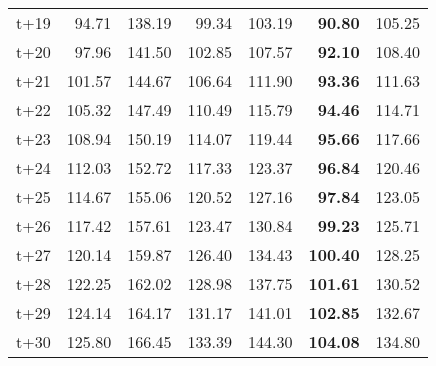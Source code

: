 \begin{table}[H]
\begin{tabular}{lrrrrrr}
t+19  & 94.71  & 138.19  & 99.34  & 103.19  & \textbf{90.80}  & 105.25  \\
t+20  & 97.96  & 141.50  & 102.85  & 107.57  & \textbf{92.10}  & 108.40  \\
t+21  & 101.57  & 144.67  & 106.64  & 111.90  & \textbf{93.36}  & 111.63  \\
t+22  & 105.32  & 147.49  & 110.49  & 115.79  & \textbf{94.46}  & 114.71  \\
t+23  & 108.94  & 150.19  & 114.07  & 119.44  & \textbf{95.66}  & 117.66  \\
t+24  & 112.03  & 152.72  & 117.33  & 123.37  & \textbf{96.84}  & 120.46  \\
t+25  & 114.67  & 155.06  & 120.52  & 127.16  & \textbf{97.84}  & 123.05  \\
t+26  & 117.42  & 157.61  & 123.47  & 130.84  & \textbf{99.23}  & 125.71  \\
t+27  & 120.14  & 159.87  & 126.40  & 134.43  & \textbf{100.40}  & 128.25  \\
t+28  & 122.25  & 162.02  & 128.98  & 137.75  & \textbf{101.61}  & 130.52  \\
t+29  & 124.14  & 164.17  & 131.17  & 141.01  & \textbf{102.85}  & 132.67  \\
t+30  & 125.80  & 166.45  & 133.39  & 144.30  & \textbf{104.08}  & 134.80  \\

\bottomrule
\end{tabular}
\end{table}
